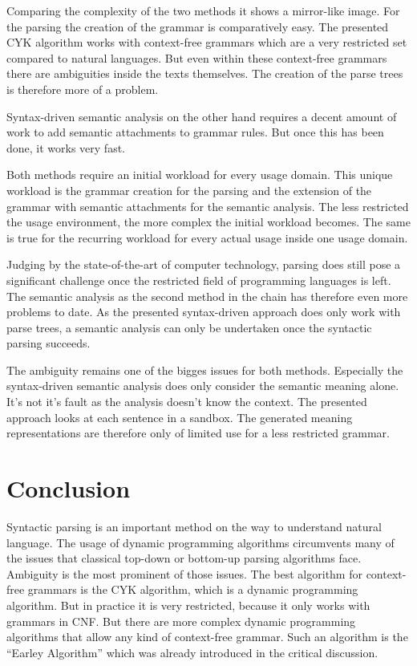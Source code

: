 \documentclass[12pt,twoside]{scrartcl}
\theoremstyle{plain}
\theoremstyle{definition}
\theoremstyle{remark}
\begin{document}
	
	Comparing the complexity of the two methods it shows a mirror-like image. For the parsing the creation of the grammar is comparatively easy. The presented CYK algorithm works with context-free grammars which are a very restricted set compared to natural languages. But even within these context-free grammars there are ambiguities inside the texts themselves. The creation of the parse trees is therefore more of a problem.
	
	Syntax-driven semantic analysis on the other hand requires a decent amount of work to add semantic attachments to grammar rules. But once this has been done, it works very fast.
	
	Both methods require an initial workload for every usage domain. This unique workload is the grammar creation for the parsing and the extension of the grammar with semantic attachments for the semantic analysis. The less restricted the usage environment, the more complex the initial workload becomes. The same is true for the recurring workload for every actual usage inside one usage domain.
	
	Judging by the state-of-the-art of computer technology, parsing does still pose a significant challenge once the restricted field of programming languages is left. The semantic analysis as the second method in the chain has therefore even more problems to date. As the presented syntax-driven approach does only work with parse trees, a semantic analysis can only be undertaken once the syntactic parsing succeeds.
	
	The ambiguity remains one of the bigges issues for both methods. Especially the syntax-driven semantic analysis does only consider the semantic meaning alone. It's not it's fault as the analysis doesn't know the context. The presented approach looks at each sentence in a sandbox. The generated meaning representations are therefore only of limited use for a less restricted grammar.
	
\section{Conclusion}
\label{sec:concl}

	Syntactic parsing is an important method on the way to understand natural language. The usage of dynamic programming algorithms circumvents many of the issues that classical top-down or bottom-up parsing algorithms face. Ambiguity is the most prominent of those issues. The best algorithm for context-free grammars is the CYK algorithm, which is a dynamic programming algorithm. But in practice it is very restricted, because it only works with grammars in CNF. But there are more complex dynamic programming algorithms that allow any kind of context-free grammar. Such an algorithm is the ``Earley Algorithm''\cite[p.~477]{Jurafsky2009b} which was already introduced in the critical discussion.
	
\end{document}
